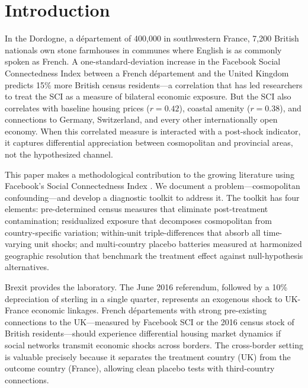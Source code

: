 \documentclass[12pt]{article}
\begin{document}
\newpage

\section{Introduction}

In the Dordogne, a d\'epartement of 400,000 in southwestern France, 7,200 British nationals own stone farmhouses in communes where English is as commonly spoken as French. A one-standard-deviation increase in the Facebook Social Connectedness Index between a French d\'epartement and the United Kingdom predicts 15\% more British census residents---a correlation that has led researchers to treat the SCI as a measure of bilateral economic exposure. But the SCI also correlates with baseline housing prices ($r = 0.42$), coastal amenity ($r = 0.38$), and connections to Germany, Switzerland, and every other internationally open economy. When this correlated measure is interacted with a post-shock indicator, it captures differential appreciation between cosmopolitan and provincial areas, not the hypothesized channel.

This paper makes a methodological contribution to the growing literature using Facebook's Social Connectedness Index \citep{bailey2018social, bailey2021international, bailey2018house, sablegreenberg2023social}. We document a problem---cosmopolitan confounding---and develop a diagnostic toolkit to address it. The toolkit has four elements: pre-determined census measures that eliminate post-treatment contamination; residualized exposure that decomposes cosmopolitan from country-specific variation; within-unit triple-differences that absorb all time-varying unit shocks; and multi-country placebo batteries measured at harmonized geographic resolution that benchmark the treatment effect against null-hypothesis alternatives.

Brexit provides the laboratory. The June 2016 referendum, followed by a 10\% depreciation of sterling in a single quarter, represents an exogenous shock to UK-France economic linkages. French d\'epartements with strong pre-existing connections to the UK---measured by Facebook SCI or the 2016 census stock of British residents---should experience differential housing market dynamics if social networks transmit economic shocks across borders. The cross-border setting is valuable precisely because it separates the treatment country (UK) from the outcome country (France), allowing clean placebo tests with third-country connections.
\end{document}
